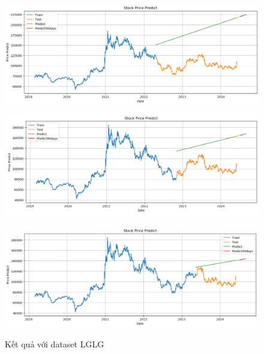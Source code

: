 \documentclass[conference]{IEEEtran}
\begin{document}
\begin{figure}[H]
    \centering
    \begin{minipage}{0.15\textwidth}
    \centering
    \includegraphics[width=1\textwidth]{Image/Linear/Linear_LG_6_4.png}
   
    \label{fig:1}
    \end{minipage}%
    \begin{minipage}{0.15\textwidth}
    \centering
    \includegraphics[width=1\textwidth]{Image/Linear/Linear_LG_7_3.png}
  
    \label{fig:2}
    \end{minipage}%
    \begin{minipage}{0.15\textwidth}
    \centering
    \includegraphics[width=1\textwidth]{Image/Linear/Linear_LG_8_2.png}

    \label{fig:3}
    \end{minipage}
    \caption{Kết quả với dataset LGLG }
\end{figure}
\end{document}
